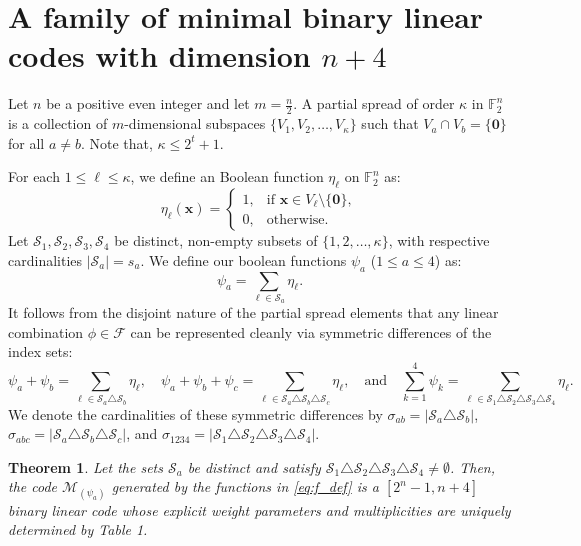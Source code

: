 \documentclass[pdflatex,sn-mathphys-num]{sn-jnl}%
\theoremstyle{thmstyleone}%
\newtheorem{theorem}{Theorem}%
\theoremstyle{thmstyletwo}%
\theoremstyle{thmstylethree}%
\begin{document}
\section{A family of minimal binary linear codes with dimension $n+4$}

 Let $n$ be a positive even integer and let $m=\frac{n}{2}$. A partial spread of order $\kappa$ in $\mathbb{F}_2^n$ is a collection of $m$-dimensional subspaces $\{V_1, V_2, \ldots, V_\kappa\}$ such that $V_a \cap V_b = \{\mathbf{0}\}$ for all $a \neq b$. Note that, $\kappa\leq 2^{t}+1$.

For each $1 \leq \ell \leq \kappa$, we define an Boolean function $\eta_\ell$ on $\mathbb{F}_2^n$ as:
\begin{equation}\label{eq:g_def}
\eta_\ell(\mathbf{x})=
\begin{cases}
1, & \text{if } \mathbf{x} \in V_\ell \setminus \{\mathbf{0}\},\\
0, & \text{otherwise.}
\end{cases} \tag{3.1}
\end{equation}
Let $\mathcal{S}_1, \mathcal{S}_2, \mathcal{S}_3, \mathcal{S}_4$ be distinct, non-empty subsets of $\{1,2,\ldots,\kappa\}$, with respective cardinalities $|\mathcal{S}_a| = s_a$. We define our boolean functions $\psi_a$ ($1 \leq a \leq 4$) as:
\begin{equation}\label{eq:f_def}
\psi_a = \sum_{\ell \in \mathcal{S}_a} \eta_\ell. \tag{3.2}
\end{equation}
It follows from the disjoint nature of the partial spread elements that any linear combination $\phi \in \mathcal{F}$ can be represented cleanly via symmetric differences of the index sets:
\begin{equation}\label{eq:f_comb}
\psi_a+\psi_b=\sum_{\ell\in \mathcal{S}_a\triangle \mathcal{S}_b}\eta_\ell, \quad \psi_a+\psi_b+\psi_c=\sum_{\ell\in \mathcal{S}_a\triangle \mathcal{S}_b\triangle \mathcal{S}_c}\eta_\ell, \quad \text{and} \quad \sum_{k=1}^{4}\psi_k=\sum_{\ell\in \mathcal{S}_1\triangle \mathcal{S}_2\triangle \mathcal{S}_3\triangle \mathcal{S}_4}\eta_\ell. \tag{3.3}
\end{equation}
We denote the cardinalities of these symmetric differences by $\sigma_{ab} = |\mathcal{S}_a \triangle \mathcal{S}_b|$, $\sigma_{abc} = |\mathcal{S}_a \triangle \mathcal{S}_b \triangle \mathcal{S}_c|$, and $\sigma_{1234} = |\mathcal{S}_1 \triangle \mathcal{S}_2 \triangle \mathcal{S}_3 \triangle \mathcal{S}_4|$.

\begin{theorem}\label{Thm_Spread_Weight}
Let the  sets $\mathcal{S}_a$ be distinct and satisfy $\mathcal{S}_1 \triangle \mathcal{S}_2 \triangle \mathcal{S}_3 \triangle \mathcal{S}_4 \neq \emptyset$. Then, the code $\mathcal{M}_{(\psi_a)}$ generated by the functions in \eqref{eq:f_def} is a $[2^n-1, n+4]$ binary linear code whose explicit weight parameters and multiplicities are uniquely determined by Table 1.
\end{theorem}
\end{document}
